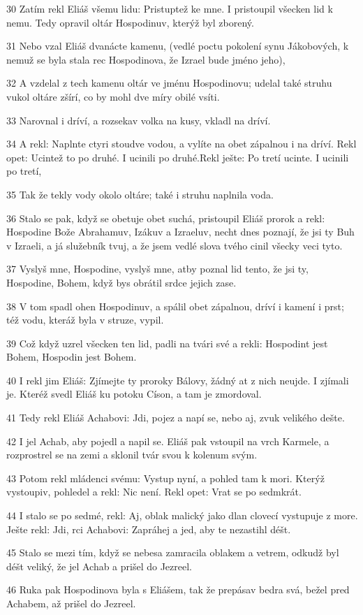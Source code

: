 \par 30 Zatím rekl Eliáš všemu lidu: Pristuptež ke mne. I pristoupil všecken lid k nemu. Tedy opravil oltár Hospodinuv, kterýž byl zborený.
\par 31 Nebo vzal Eliáš dvanácte kamenu, (vedlé poctu pokolení synu Jákobových, k nemuž se byla stala rec Hospodinova, že Izrael bude jméno jeho),
\par 32 A vzdelal z tech kamenu oltár ve jménu Hospodinovu; udelal také struhu vukol oltáre zšírí, co by mohl dve míry obilé vsíti.
\par 33 Narovnal i dríví, a rozsekav volka na kusy, vkladl na dríví.
\par 34 A rekl: Naplnte ctyri stoudve vodou, a vylíte na obet zápalnou i na dríví. Rekl opet: Ucintež to po druhé. I ucinili po druhé.Rekl ješte: Po tretí ucinte. I ucinili po tretí,
\par 35 Tak že tekly vody okolo oltáre; také i struhu naplnila voda.
\par 36 Stalo se pak, když se obetuje obet suchá, pristoupil Eliáš prorok a rekl: Hospodine Bože Abrahamuv, Izákuv a Izraeluv, necht dnes poznají, že jsi ty Buh v Izraeli, a já služebník tvuj, a že jsem vedlé slova tvého cinil všecky veci tyto.
\par 37 Vyslyš mne, Hospodine, vyslyš mne, atby poznal lid tento, že jsi ty, Hospodine, Bohem, když bys obrátil srdce jejich zase.
\par 38 V tom spadl ohen Hospodinuv, a spálil obet zápalnou, dríví i kamení i prst; též vodu, kteráž byla v struze, vypil.
\par 39 Což když uzrel všecken ten lid, padli na tvári své a rekli: Hospodint jest Bohem, Hospodin jest Bohem.
\par 40 I rekl jim Eliáš: Zjímejte ty proroky Bálovy, žádný at z nich neujde. I zjímali je. Kteréž svedl Eliáš ku potoku Císon, a tam je zmordoval.
\par 41 Tedy rekl Eliáš Achabovi: Jdi, pojez a napí se, nebo aj, zvuk velikého dešte.
\par 42 I jel Achab, aby pojedl a napil se. Eliáš pak vstoupil na vrch Karmele, a rozprostrel se na zemi a sklonil tvár svou k kolenum svým.
\par 43 Potom rekl mládenci svému: Vystup nyní, a pohled tam k mori. Kterýž vystoupiv, pohledel a rekl: Nic není. Rekl opet: Vrat se po sedmkrát.
\par 44 I stalo se po sedmé, rekl: Aj, oblak malický jako dlan clovecí vystupuje z more. Ješte rekl: Jdi, rci Achabovi: Zapráhej a jed, aby te nezastihl déšt.
\par 45 Stalo se mezi tím, když se nebesa zamracila oblakem a vetrem, odkudž byl déšt veliký, že jel Achab a prišel do Jezreel.
\par 46 Ruka pak Hospodinova byla s Eliášem, tak že prepásav bedra svá, bežel pred Achabem, až prišel do Jezreel.

